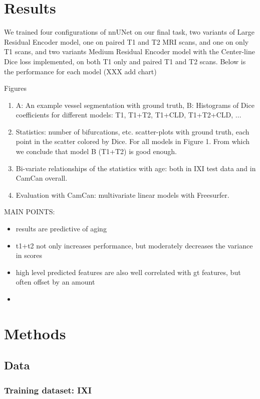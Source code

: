 \documentclass[pdflatex,sn-mathphys-num]{sn-jnl}
\begin{document}
\section{Results}

We trained four configurations of nnUNet on our final task, two variants of Large Residual Encoder model, one on paired T1 and T2 MRI scans, and one on only T1 scans, and two variants Medium Residual Encoder model with the Center-line Dice loss implemented, on both T1 only and paired T1 and T2 scans. Below is the performance for each model (XXX add chart)

Figures
\begin{enumerate}
    \item A: An example vessel segmentation with ground truth, B: Histograms of Dice coefficients for different models: T1, T1+T2, T1+CLD, T1+T2+CLD, ...
    \item Statistics: number of bifurcations, etc. scatter-plots with ground truth, each point in the scatter colored by Dice. For all models in Figure 1. From which we conclude that model B (T1+T2) is good enough.
    \item Bi-variate relationships of the statistics with age: both in IXI test data and in CamCan overall.
    \item Evaluation with CamCan: multivariate linear models with Freesurfer.
\end{enumerate}


MAIN POINTS:
\begin{itemize}
    \item results are predictive of aging
    \item t1+t2 not only increases performance, but moderately decreases the variance in scores
    \item high level predicted features are also well correlated with gt features, but often offset by an amount
    \item

\end{itemize}

\section{Methods}

\subsection{Data}

\subsubsection{Training dataset: IXI}
\end{document}
